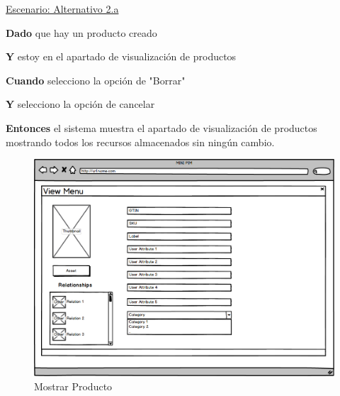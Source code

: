 \underline{Escenario: Alternativo 2.a}\par
\vspace{0.15cm}
\textbf{Dado} que hay un producto creado\par
\textbf{Y} estoy en el apartado de visualización de productos\par
\textbf{Cuando} selecciono la opción de "Borrar"\par
\textbf{Y} selecciono la opción de cancelar\par
\textbf{Entonces} el sistema muestra el apartado de visualización de productos mostrando todos los recursos almacenados sin ningún cambio.\par
\vspace{0.20cm}

\begin{figure}[H]
    \includegraphics[width=1\linewidth]{mockups/RF2.X_MostrarProducto(Menu visualizacion).png}
    \caption{Mostrar Producto}
   \end{figure}
\vspace{1.0cm}


\newpage %